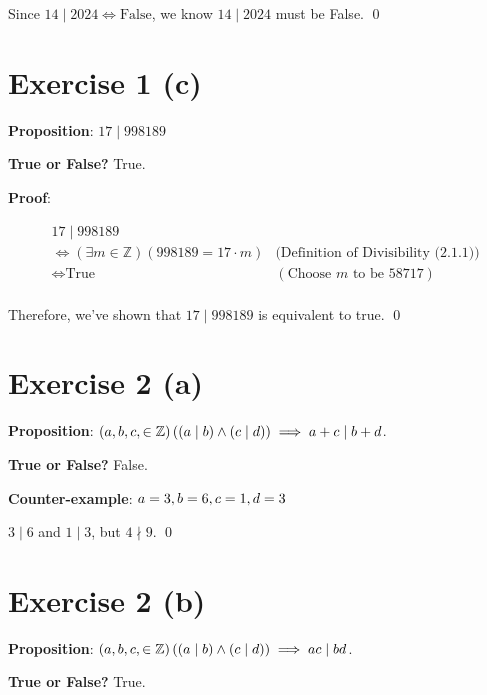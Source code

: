 \documentclass{article} %
\begin{document}
Since $14 \mid 2024 \iff \text{False}$, we know $14 \mid 2024$ must be False.
\qed
\bigskip

\section*{Exercise 1 (c)}

\bigskip
\noindent
\textbf{Proposition}: $17 \mid 998189$

\bigskip
\noindent
\textbf{True or False?} True.

\bigskip
\noindent
\textbf{Proof}:

\begin{align*}
     & 17 \mid 998189                                       &                                             \\
     & \iff (\exists m \in \mathbb{Z})(998189 = 17 \cdot m) & \text{(Definition of Divisibility (2.1.1))} \\
     & \iff \text{True}                                     & (\text{Choose } m \text{ to be } 58717)     \\
\end{align*}

\noindent Therefore, we've shown that $17 \mid 998189$ is equivalent to true.
\qed
\bigskip

\section*{Exercise 2 (a)}

\bigskip
\noindent
\textbf{Proposition}: $(a,\space b,\space c,\space \in \mathbb{Z}) \left((a \mid b) \land (c \mid d) \right) \implies a + c \mid b + d$.

\bigskip
\noindent
\textbf{True or False?} False.

\bigskip
\noindent
\textbf{Counter-example}: $a = 3, \space b = 6, \space c = 1, \space d = 3$

$3 \mid 6$ and $1 \mid 3$, but $4 \nmid 9$.
\qed
\bigskip

\section*{Exercise 2 (b)}

\bigskip
\noindent
\textbf{Proposition}: $(a,\space b,\space c,\space \in \mathbb{Z}) \left((a \mid b) \land (c \mid d) \right) \implies ac \mid bd$.

\bigskip
\noindent
\textbf{True or False?} True.
\end{document}
